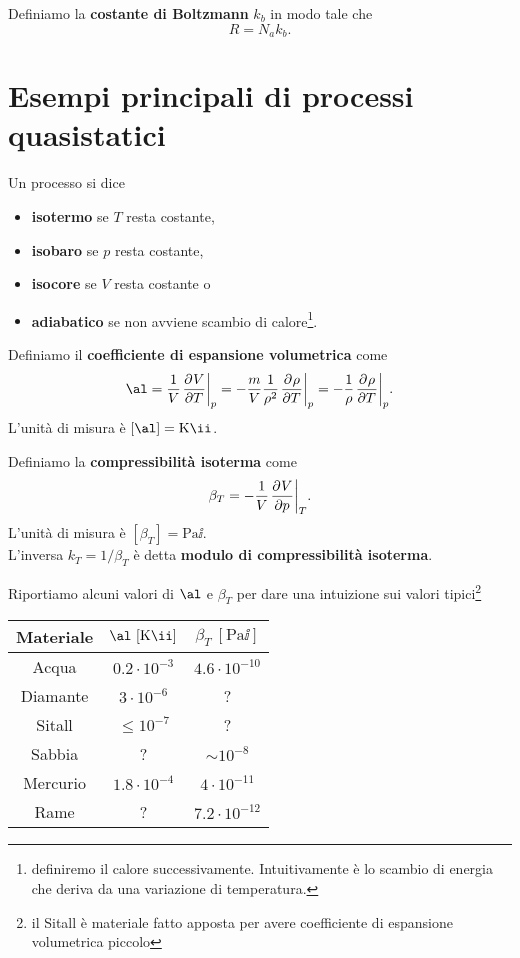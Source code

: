 \begin{definition}
Definiamo la \textbf{costante di Boltzmann} $k_b$ in modo tale che 
\[R=N_a k_b.\]
\end{definition}




\section{Esempi principali di processi quasistatici}
\begin{definition}
Un processo si dice
\begin{itemize}
\item \textbf{isotermo} se $T$ resta costante,
\item \textbf{isobaro} se $p$ resta costante,
\item \textbf{isocore} se $V$ resta costante o
\item \textbf{adiabatico} se non avviene scambio di calore\footnote{definiremo il calore successivamente. Intuitivamente \`e lo scambio di energia che deriva da una variazione di temperatura.}.
\end{itemize}
\end{definition}

\begin{definition}
Definiamo il \textbf{coefficiente di espansione volumetrica} come
\[\al=\frac1V\ppb TVp=-\frac mV\frac1{\rho^2}\ppb T\rho p=-\frac1\rho\ppb T\rho p.\]
L'unit\`a di misura \`e $[\al]=\mathrm{K}\ii$.
\end{definition}


\begin{definition}
Definiamo la \textbf{compressibilit\`a isoterma} come
\[\beta_T=-\frac1V\ppb pVT.\]
L'unit\`a di misura \`e $[\beta_T]=\mathrm{Pa}\ii$.\\
L'inversa $k_T=1/\beta_T$ \`e detta \textbf{modulo di compressibilit\`a isoterma}.
\end{definition}

\noindent Riportiamo alcuni valori di $\al$ e $\beta_T$ per dare una intuizione sui valori tipici\footnote{il Sitall \`e materiale fatto apposta per avere coefficiente di espansione volumetrica piccolo}
\begin{center}
\begin{tabular}[ht]{|c|c|c|}
\hline 
Materiale&$\al\ [\mathrm{K}\ii]$&$\beta_T\ [\mathrm{Pa}\ii]$\\\hline
Acqua&$0.2\cdot 10^{-3}$&$4.6\cdot 10^{-10}$\\
Diamante&$3\cdot 10^{-6}$&?\\
Sitall&$\leq 10^{-7}$&?\\
Sabbia&?&$\sim10^{-8}$\\
Mercurio&$1.8\cdot 10^{-4}$&$4\cdot10^{-11}$\\
Rame&?&$7.2\cdot10^{-12}$\\
\hline
\end{tabular}
\end{center}


